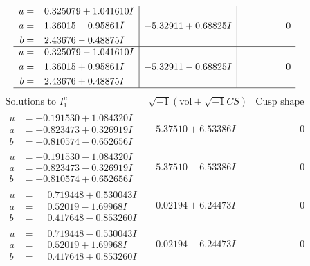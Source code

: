 \documentclass[1p]{elsarticle_modified}
\theoremstyle{definition}
\newcommand{\I}{\sqrt{-1}}
\begin{document}
$$\begin{array}{c|c|c}
\begin{aligned}
u &= \phantom{-}0.325079 + 1.041610 I \\
a &= \phantom{-}1.36015 - 0.95861 I \\
b &= \phantom{-}2.43676 - 0.48875 I\end{aligned}
 & -5.32911 + 0.68825 I & \phantom{-0.000000 } 0 \\ \hline\begin{aligned}
u &= \phantom{-}0.325079 - 1.041610 I \\
a &= \phantom{-}1.36015 + 0.95861 I \\
b &= \phantom{-}2.43676 + 0.48875 I\end{aligned}
 & -5.32911 - 0.68825 I & \phantom{-0.000000 } 0\\
 \hline 
 \end{array}$$\newpage$$\begin{array}{c|c|c}  
\text{Solutions to }I^u_{1}& \I (\text{vol} + \sqrt{-1}CS) & \text{Cusp shape}\\
 \hline 
\begin{aligned}
u &= -0.191530 + 1.084320 I \\
a &= -0.823473 + 0.326919 I \\
b &= -0.810574 - 0.652656 I\end{aligned}
 & -5.37510 + 6.53386 I & \phantom{-0.000000 } 0 \\ \hline\begin{aligned}
u &= -0.191530 - 1.084320 I \\
a &= -0.823473 - 0.326919 I \\
b &= -0.810574 + 0.652656 I\end{aligned}
 & -5.37510 - 6.53386 I & \phantom{-0.000000 } 0 \\ \hline\begin{aligned}
u &= \phantom{-}0.719448 + 0.530043 I \\
a &= \phantom{-}0.52019 - 1.69968 I \\
b &= \phantom{-}0.417648 - 0.853260 I\end{aligned}
 & -0.02194 + 6.24473 I & \phantom{-0.000000 } 0 \\ \hline\begin{aligned}
u &= \phantom{-}0.719448 - 0.530043 I \\
a &= \phantom{-}0.52019 + 1.69968 I \\
b &= \phantom{-}0.417648 + 0.853260 I\end{aligned}
 & -0.02194 - 6.24473 I & \phantom{-0.000000 } 0 \\ \hline\begin{aligned}

\end{aligned}
\end{array}$$
\end{document}
